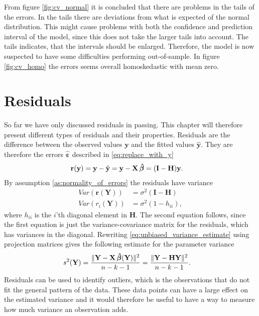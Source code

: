 From figure \ref{fig:cv_normal} it is concluded that there are problems in the tails of the errors. 
In the tails there are deviations from what is expected of the normal distribution. 
This might cause problems with both the confidence and prediction interval of the model, since this does not take the larger tails into account.
The tails indicates, that the intervals should be enlarged.
Therefore, the model is now suspected to have some difficulties performing out-of-sample. 
In figure \ref{fig:cv_homo} the errors seems overall homoskedastic with mean zero. 

\section{Residuals}\label{subsec:residuals}
So far we have only discussed residuals in passing. 
This chapter will therefore present different types of residuals and their properties.
Residuals are the difference between the observed values $\textbf{y}$ and the fitted values $\hat{\textbf{y}}$. They are therefore the errors $\boldsymbol{\hat{\varepsilon}}$ described in \eqref{eq:replace_with_y}
\begin{align*}
    \textbf{r}(\textbf{y}) &= \textbf{y} - \hat{\textbf{y}} = \textbf{y} - \textbf{X} \operatorname{\boldsymbol{\hat{\beta}}} = (\textbf{I} - \textbf{H}) \textbf{y}.
\end{align*}
By assumption \ref{as:normality_of_errors} the residuals have variance
\begin{align*}
    Var(\textbf{r}(\textbf{Y})) &= \sigma^2 (\textbf{I} - \textbf{H}) \\
    Var(r_i(\textbf{Y})) &= \sigma^2(1 - h_{ii}),
\end{align*}
where $h_{ii}$ is the $i$'th diagonal element in $\textbf{H}$. The second equation follows, since the first equation is just the variance-covariance matrix for the residuals, which has variances in the diagonal.
Rewriting \eqref{eq:unbiased_variance_estimate} using projection matrices gives the following estimate for the parameter variance
\begin{align*}
    s^2(\textbf{Y}) &= \frac{\| \textbf{Y} - \textbf{X} \operatorname{\boldsymbol{\hat{\beta}}} (\textbf{Y}) \|^2 }{n-k-1} = \frac{\| \textbf{Y} - \textbf{H} \textbf{Y} \|^2}{n-k-1} .
\end{align*}
Residuals can be used to identify outliers, which is the observations that do not fit the general pattern of the data.
These data points can have a large effect on the estimated variance and it would therefore be useful to have a way to measure how much variance an observation adds.\\
